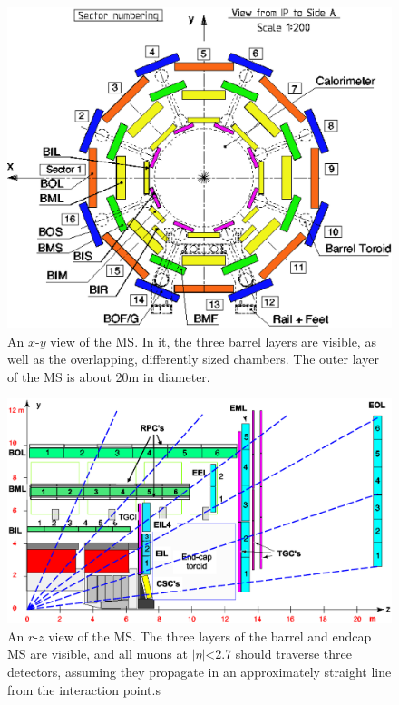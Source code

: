\begin{centering}
\begin{figure}[bth]
\myfloatalign
\includegraphics[width=.90\linewidth]{figures/atlas/Muon_sector_numbering.eps}
\caption{An $x$-$y$ view of the \ac{MS}. In it, the three barrel layers are visible, as well as the overlapping, differently sized chambers. The outer layer of the \ac{MS} is about 20m in diameter.}
\label{fig:muon_xy}
\end{figure}
\end{centering}

\begin{centering}
\begin{figure}[bth]
\myfloatalign
\includegraphics[width=.90\linewidth]{figures/atlas/Muon_rz_large_sect_6.eps}
\caption{An $r$-$z$ view of the \ac{MS}. The three layers of the barrel and endcap \ac{MS} are visible, and all muons at $|\eta|$<2.7 should traverse three detectors, assuming they propagate in an approximately straight line from the interaction point.s}
\label{fig:muon_rz}
\end{figure}
\end{centering}

